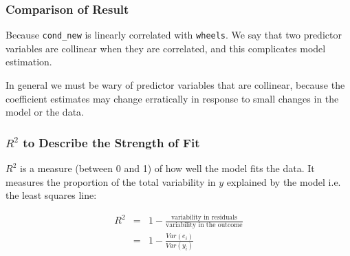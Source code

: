 \documentclass[handout]{beamer}
\newcommand{\blue}[1]{\textcolor{blue2}{#1}}
\begin{document}
\begin{frame}[fragile]
\frametitle{Comparison of Result}

Because {\tt cond\_new} is linearly correlated with {\tt wheels}.  We say that two predictor variables are \blue{collinear} when they are correlated, and this complicates model estimation.

\pause\vspace{0.5cm}

In general we must be wary of predictor variables that are collinear, because the coefficient estimates may change erratically in response to small changes in the model or the data.

\end{frame}


\begin{frame}[fragile]
\frametitle{$R^2$ to Describe the Strength of Fit}
%
%
$R^2$ is a measure (between 0 and 1) of how well the model fits the data.  It measures the proportion of the total variability in $y$ explained by the model i.e. the least squares line:

\vspace{0.25cm}

\begin{eqnarray*}
R^2 &=& 1 - \frac{\mbox{variability in residuals}}{\mbox{variability in the outcome}}\\
&=& 1 - \frac{Var(e_i)}{Var(y_i)}
\end{eqnarray*}

\end{frame}
\end{document}
